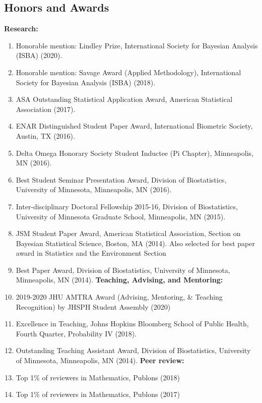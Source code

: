 \documentclass[12pt]{article}
\newcommand{\mydot}[1]{\begin{enumerate}[label=$\circ$,leftmargin=\parindent]\setlength{\itemsep}{#1}}
\newcommand{\ee}{\end{enumerate}}
\newcommand{\mylift}[1]{\vspace*{#1}}
\begin{document}
\subsection*{Honors and Awards}
\vskip -2mm \noindent \textbf{Research:} 
\mydot{-0.1em}
\item \vskip -4mm Honorable mention: Lindley Prize, International Society
for Bayesian Analysis (ISBA) (2020).
\item Honorable mention: Savage Award (Applied Methodology), International Society
for Bayesian Analysis (ISBA) (2018).
\item ASA Outstanding Statistical Application Award, American Statistical
Association (2017).
\item ENAR Distinguished Student Paper Award, International Biometric Society,
Austin, TX (2016).
\item Delta Omega Honorary Society Student Inductee (Pi Chapter), Minneapolis,
MN (2016).
\item Best Student Seminar Presentation Award, Division of Biostatistics, University
of Minnesota, Minneapolis, MN (2016).
\item Inter-disciplinary Doctoral Fellowship 2015-16, Division of Biostatistics, University
of Minnesota Graduate School, Minneapolis, MN (2015).
\item JSM Student Paper Award, American Statistical Association, Section on
Bayesian Statistical Science, Boston, MA (2014).
Also selected for best paper award in Statistics and the Environment Section
\item Best Paper Award, Division of Biostatistics, University of Minnesota, Minneapolis,
MN (2014).
\vskip 1mm \noindent \textbf{Teaching, Advising, and Mentoring:} \vskip -3mm
\item 2019-2020 JHU AMTRA Award (Advising, Mentoring, \& Teaching Recognition) by JHSPH Student Assembly (2020)
\item Excellence in Teaching, Johns Hopkins Bloomberg School of Public Health,
Fourth Quarter, Probability IV (2018).
\item Outstanding Teaching Assistant Award, Division of Biostatistics, University of
Minnesota, Minneapolis, MN (2014).
\vskip 1mm \noindent  \textbf{Peer review:} 
\item Top 1\% of reviewers in Mathematics, Publons (2018)
\item Top 1\% of reviewers in Mathematics, Publons (2017)\\
\ee
\mylift{-2.5em}
\end{document}
